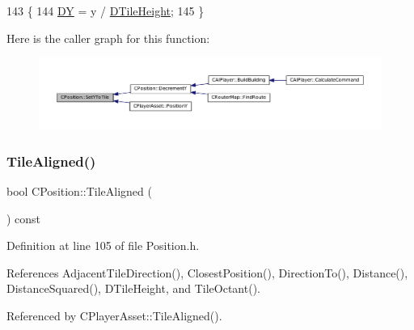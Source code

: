 \begin{DoxyCode}
143                                \{
144     \hyperlink{classCPosition_a84139c9e8eb547e7cf3cb851739943a4}{DY} = y / \hyperlink{classCPosition_a202ebb83e86df75cfb76cf1241ba817c}{DTileHeight};
145 \}
\end{DoxyCode}
Here is the caller graph for this function\+:\nopagebreak
\begin{figure}[H]
\begin{center}
\leavevmode
\includegraphics[width=350pt]{classCPosition_a5805485f623398197ac595a5d389f691_icgraph}
\end{center}
\end{figure}
\hypertarget{classCPosition_abe4ef039d9bbf51cd542167b5a0cd88e}{}\label{classCPosition_abe4ef039d9bbf51cd542167b5a0cd88e} 
\subsubsection{\texorpdfstring{Tile\+Aligned()}{TileAligned()}}
{\footnotesize\ttfamily bool C\+Position\+::\+Tile\+Aligned (\begin{DoxyParamCaption}{ }\end{DoxyParamCaption}) const\hspace{0.3cm}{\ttfamily [inline]}}



Definition at line 105 of file Position.\+h.



References Adjacent\+Tile\+Direction(), Closest\+Position(), Direction\+To(), Distance(), Distance\+Squared(), D\+Tile\+Height, and Tile\+Octant().



Referenced by C\+Player\+Asset\+::\+Tile\+Aligned().


